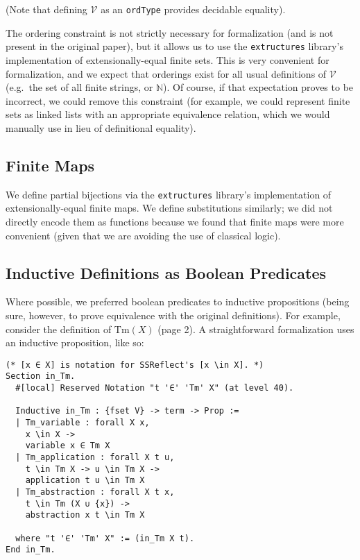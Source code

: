\documentclass{article}
\begin{document}
(Note that defining $\mathcal{V}$ as an \verb|ordType| provides decidable equality).

The ordering constraint is not strictly necessary for formalization (and is not present in the
original paper), but it allows us to use the \verb|extructures| library's implementation of
extensionally-equal finite sets. This is very convenient for formalization, and we expect
that orderings exist for all usual definitions of $\mathcal{V}$ (e.g.\ the set of all finite
strings, or $\mathbb{N}$). Of course, if that expectation proves to be incorrect, we could remove
this constraint (for example, we could represent finite sets as linked lists with an appropriate
equivalence relation, which we would manually use in lieu of definitional equality).

\subsection{Finite Maps}

We define partial bijections via the \verb|extructures| library's implementation of
extensionally-equal finite maps. We define substitutions similarly; we did not directly encode them
as functions because we found that finite maps were more convenient (given that we are avoiding
the use of classical logic).

\subsection{Inductive Definitions as Boolean Predicates}

Where possible, we preferred boolean predicates to inductive propositions (being sure, however, to prove
equivalence with the original definitions). For example,
consider the definition of $\textrm{Tm}(X)$ (page 2). A straightforward formalization uses
an inductive proposition, like so:

\begin{verbatim}
(* [x ∈ X] is notation for SSReflect's [x \in X]. *)
Section in_Tm.
  #[local] Reserved Notation "t '∈' 'Tm' X" (at level 40).

  Inductive in_Tm : {fset V} -> term -> Prop :=
  | Tm_variable : forall X x,
    x \in X ->
    variable x ∈ Tm X
  | Tm_application : forall X t u,
    t \in Tm X -> u \in Tm X ->
    application t u \in Tm X
  | Tm_abstraction : forall X t x,
    t \in Tm (X ∪ {x}) ->
    abstraction x t \in Tm X

  where "t '∈' 'Tm' X" := (in_Tm X t).
End in_Tm.
\end{verbatim}
\end{document}
